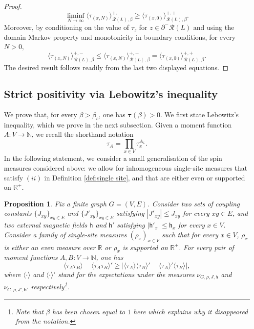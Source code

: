 \documentclass[11pt,a4paper]{article}
\numberwithin{equation}{section}
\theoremstyle{plain}
\newtheorem{Prop}[Thm]{Proposition}
\theoremstyle{definition}
\begin{document}
\begin{proof}
\begin{equation}
\liminf_{N\to\infty} \langle \tau_{(x,N)} 
 \rangle^{+,-}_{\mathcal{R}(L),\beta}\geq \langle \tau_{(x,0)} \rangle^{+,+}_{\mathcal{R}(L),\beta}.
 \end{equation}
Moreover, by conditioning on the value of $\tau_z$ for $z\in \partial^- \mathcal{R}(L)$ and using the domain Markov property and monotonicity in boundary conditions, for every $N>0$,
\begin{equation}
    \langle \tau_{(x,N)}\rangle^{+,-}_{\mathcal{R}(L),\beta}\leq \langle \tau_{(x,N)} \rangle^{+,+}_{\mathcal{R}(L),\beta}= \langle \tau_{(x,0)} \rangle^{+,+}_{\mathcal{R}(L),\beta}.
\end{equation}
The desired result follows readily from the last two displayed equations.
\end{proof}



\subsection{Strict positivity via Lebowitz's inequality}

We prove that, for every $\beta>\beta_c$, one has $\boldsymbol{\tau}(\beta) > 0$. We first state Lebowitz's inequality, which we prove in the next subsection. Given a moment function $A:V\to\mathbb{N}$, we recall the shorthand notation 
\begin{equation}
\tau_A=\prod_{x\in V} \tau^{A_x}_x.
\end{equation}
In the following statement, we consider a small generalisation of the spin measures considered above: we allow for inhomogeneous single-site measures that satisfy $(ii)$ in Definition \ref{def:single site}, and that are either even or supported on $\mathbb R^+$.


\begin{Prop} \label{prop: lebowitz}
Fix a finite graph $G = (V,E)$. Consider two sets of coupling constants $\{J_{xy}\}_{xy\in E}$ and $\{J'_{xy}\}_{xy\in E}$ satisfying $|J'_{xy}| \le J_{xy}$ for every $xy\in E$, and two external magnetic fields $\mathsf{h}$ and $\mathsf{h}'$ satisfying $|\mathsf{h}'_x|\le \mathsf{h}_x$ for every $x\in V$. Consider a family of single-site measures $(\rho_x)_{x\in V}$ such that for every $x\in V$, $\rho_x$ is either an even measure over $\mathbb{R}$ or $\rho_x$ is supported on $\mathbb{R}^+$. For every pair of moment functions $A, B:V\to\mathbb{N}$, one has
\begin{equation}
\langle \tau_A \tau_B \rangle - \langle \tau_A \tau_B \rangle' \ge |\langle \tau_A \rangle \langle\tau_B \rangle' - \langle \tau_A \rangle' \langle \tau_B \rangle|,
\end{equation}
where $\langle \cdot \rangle$ and $\langle \cdot \rangle'$ stand for the expectations under the measures $\nu_{G,\rho,J, \mathsf{h}}$ and $\nu_{G,\rho,J',\mathsf{h}'}$ respectively\footnote{Note that $\beta$ has been chosen equal to $1$ here which explains why it disappeared from the notation.}.
\end{Prop}
\end{document}
